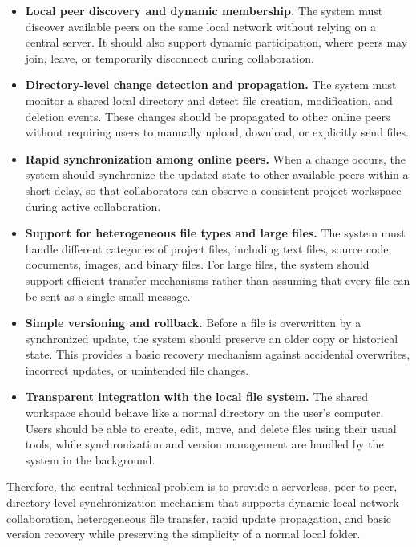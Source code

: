 \begin{itemize}
\item \textbf{Local peer discovery and dynamic membership.}
The system must discover available peers on the same local network without relying on a central server. It should also support dynamic participation, where peers may join, leave, or temporarily disconnect during collaboration.

\item \textbf{Directory-level change detection and propagation.}
The system must monitor a shared local directory and detect file creation, modification, and deletion events. These changes should be propagated to other online peers without requiring users to manually upload, download, or explicitly send files.

\item \textbf{Rapid synchronization among online peers.}
When a change occurs, the system should synchronize the updated state to other available peers within a short delay, so that collaborators can observe a consistent project workspace during active collaboration.

\item \textbf{Support for heterogeneous file types and large files.}
The system must handle different categories of project files, including text files, source code, documents, images, and binary files. For large files, the system should support efficient transfer mechanisms rather than assuming that every file can be sent as a single small message.

\item \textbf{Simple versioning and rollback.}
Before a file is overwritten by a synchronized update, the system should preserve an older copy or historical state. This provides a basic recovery mechanism against accidental overwrites, incorrect updates, or unintended file changes.

\item \textbf{Transparent integration with the local file system.}
The shared workspace should behave like a normal directory on the user's computer. Users should be able to create, edit, move, and delete files using their usual tools, while synchronization and version management are handled by the system in the background.
\end{itemize}
Therefore, the central technical problem is to provide a serverless, peer-to-peer, directory-level synchronization mechanism that supports dynamic local-network collaboration, heterogeneous file transfer, rapid update propagation, and basic version recovery while preserving the simplicity of a normal local folder. 
